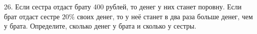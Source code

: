 26. Если сестра отдаст брату 400 рублей, то денег у них станет поровну. Если брат отдаст сестре $20\%$ своих денег, то у неё станет в два раза больше денег, чем у брата.
Определите, сколько денег у брата и сколько у сестры.\\

